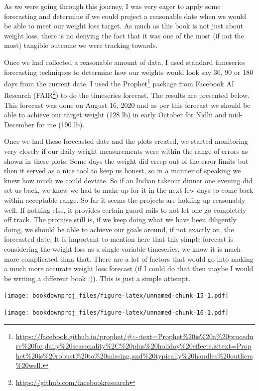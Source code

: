 \documentclass[
  oneside]{book}
\DeclareRobustCommand{\href}[2]{#2\footnote{\url{#1}}}
\begin{document}
As we were going through this journey, I was very eager to apply some forecasting and determine if we could project a reasonable date when we would be able to meet our weight loss target. As much as this book is not just about weight loss, there is no denying the fact that it was one of the most (if not the most) tangible outcome we were tracking towards.

Once we had collected a reasonable amount of data, I used standard timeseries forecasting techniques to determine how our weights would look say 30, 90 or 180 days from the current date. I used the \href{https://facebook.github.io/prophet/\#:~:text=Prophet\%20is\%20a\%20procedure\%20for,daily\%20seasonality\%2C\%20plus\%20holiday\%20effects.\&text=Prophet\%20is\%20robust\%20to\%20missing,and\%20typically\%20handles\%20outliers\%20well.}{Prophet} package from Facebook AI Research (\href{https://github.com/facebookresearch}{FAIR}) to do the timeseries forecast. The results are presented below. This forecast was done on August 16, 2020 and as per this forecast we should be able to achieve our target weight (128 lb) in early October for Nidhi and mid-December for me (190 lb).

Once we had these forecasted date and the plots created, we started monitoring very closely if our daily weight measurements were within the range of errors as shown in these plots. Some days the weight did creep out of the error limits but then it served as a nice tool to keep us honest, so in a manner of speaking we knew how much we could deviate. So if an Indian takeout dinner one evening did set us back, we knew we had to make up for it in the next few days to come back within acceptable range. So far it seems the projects are holding up reasonably well. If nothing else, it provides certain guard rails to not let one go completely off track. The promise still is, if we keep doing what we have been diligently doing, we should be able to achieve our goals around, if not exactly on, the forecasted date. It is important to mention here that this simple forecast is considering the weight loss as a single variable timeseries, we know it is much more complicated than that. There are a lot of factors that would go into making a much more accurate weight loss forecast (if I could do that then maybe I would be writing a different book :)). This is just a simple attempt.

\texttt{[image: bookdownproj\_files/figure-latex/unnamed-chunk-15-1.pdf]}

\texttt{[image: bookdownproj\_files/figure-latex/unnamed-chunk-16-1.pdf]}
\end{document}
